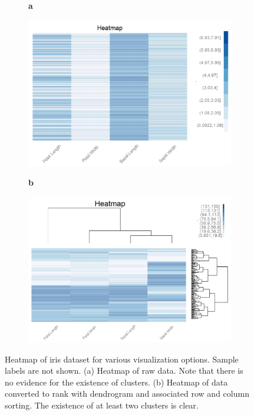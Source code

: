\documentclass[12pt]{article}
\begin{document}
\begin{figure}[t!]
	\centering
	\begin{subfigure}[t]{0.01\textwidth}
		\textbf{a}
	\end{subfigure}
	\begin{subfigure}[t]{0.46\textwidth}
		\includegraphics[width=\textwidth,valign=t]{Figures/Iris/HeatmapRawnodendro.png}
		\subcaption{}
		\label{fig:FigHeatmapRawnodendro}
	\end{subfigure}\hfill
	\begin{subfigure}[t]{0.01\textwidth}
		\textbf{b}
	\end{subfigure}
	\begin{subfigure}[t]{0.46\textwidth}
		\includegraphics[width=\textwidth,valign=t]{Figures/Iris/HeatmapRanksDendro.png}
		\subcaption{}
		\label{fig:FigHeatmapRanksdendro}
	\end{subfigure}
	\vspace{-1.5\baselineskip}
	\caption{Heatmap of iris dataset for various visualization options. Sample labels are not shown. (a) Heatmap of raw data. Note that there is no evidence for the existence of clusters. (b) Heatmap of data converted to rank with dendrogram and associated row and column sorting. The existence of at least two clusters is clear.}
	\label{fig:FigHeatmap}
\end{figure}
\end{document}
